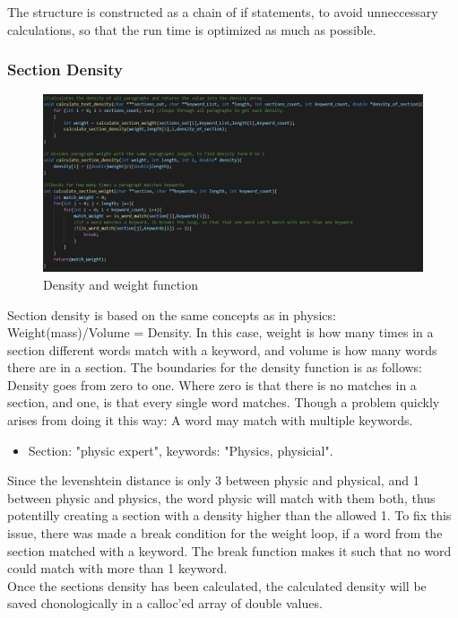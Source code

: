 The structure is constructed as a chain of if statements, to avoid unneccessary
calculations, so that the run time is optimized as much as possible.\\
\subsubsection{Section Density}
\begin{figure}[H]
  \centering
  \includegraphics[scale = 0.6]{figures/section_density}
  \caption{Density and weight function}\label{fig:ie}
\end{figure}
Section density is based on the same concepts as in physics: Weight(mass)/Volume = Density.
In this case, weight is how many times in a section different words match with a keyword, and volume is how many words there
are in a section. The boundaries for the density function is as follows: Density goes from zero to one. 
Where zero is that there is no matches in a section, and one, is that every single word matches. Though a problem quickly arises
from doing it this way: A word may match with multiple keywords.\\
\begin{itemize}
  \item Section: "physic expert", keywords: "Physics, physicial".
\end{itemize}
Since the levenshtein distance is only 3 between physic and physical, and 1 between physic and physics,
the word physic will match with them both, thus potentilly creating a section with a density higher than the allowed 1.
To fix this issue, there was made a break condition for the weight loop, if a word from the section matched with a keyword.
The break function makes it such that no word could match with more than 1 keyword.
\\
Once the sections density has been calculated, the calculated density will be saved chonologically in a calloc'ed array of double values. 

